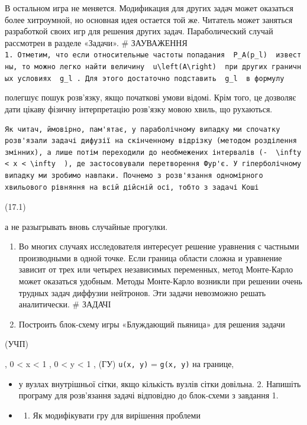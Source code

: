 \documentclass[
  ukrainian,
]{article}
\providecommand{\tightlist}{%
  \setlength{\itemsep}{0pt}\setlength{\parskip}{0pt}}
\begin{document}
В остальном игра не меняется. Модификация для других задач может
оказаться более хитроумной, но основная идея остается той же. Читатель
может заняться разработкой своих игр для решения других задач.
Параболический случай рассмотрен в разделе «Задачи». \# ЗАУВАЖЕННЯ
\texttt{1.\ Отметим,\ что\ если\ относительные\ частоты\ попадания\ \ \textquotesingle{}P\_A(p\_l)\textquotesingle{}\ \ известны,\ то\ можно\ легко\ найти\ величину\ \ \textquotesingle{}u\textbackslash{}left(A\textbackslash{}right)\textquotesingle{}\ \ при\ других\ граничных\ условиях\ \ \textquotesingle{}g\_l\textquotesingle{}\ .\ Для\ этого\ достаточно\ подставить\ \ \textquotesingle{}g\_l\textquotesingle{}\ \ в\ формулу}

полегшує пошук розв'язку, якщо початкові умови відомі. Крім того, це
дозволяє дати цікаву фізичну інтерпретацію розв'язку мовою хвиль, що
рухаються.

\begin{verbatim}
Як читач, ймовірно, пам'ятає, у параболічному випадку ми спочатку розв'язали задачі дифузії на скінченному відрізку (методом розділення змінних), а лише потім переходили до необмежених інтервалів (-  \infty < x < \infty  ), де застосовували перетворення Фур'є. У гіперболічному випадку ми зробимо навпаки. Почнемо з розв'язання одномірного хвильового рівняння на всій дійсній осі, тобто з задачі Коші
\end{verbatim}

(17.1)

а не разыгрывать вновь случайные прогулки.

\begin{enumerate}
\def\labelenumi{\arabic{enumi}.}
\setcounter{enumi}{1}
\tightlist
\item
  Во многих случаях исследователя интересует решение уравнения с
  частными производными в одной точке. Если граница области сложна и
  уравнение зависит от трех или четырех независимых переменных, метод
  Монте-Карло может оказаться удобным. Методы Монте-Карло возникли при
  решении очень трудных задач диффузии нейтронов. Эти задачи невозможно
  решать аналитически. \# ЗАДАЧІ
\item
  Построить блок-схему игры «Блуждающий пьяница» для решения задачи
\end{enumerate}

(УЧП)

, 0 \textless{} x \textless{} 1 , 0 \textless{} y \textless{} 1 , (ГУ)
\texttt{u(x,\ y)} = \texttt{g(x,\ y)} на границе,

\begin{itemize}
\item
  у вузлах внутрішньої сітки, якщо кількість вузлів сітки довільна. 2.
  Напишіть програму для розв'язання задачі відповідно до блок-схеми з
  завдання 1.
\item
  \begin{enumerate}
  \def\labelenumi{\arabic{enumi}.}
  \setcounter{enumi}{2}
  \tightlist
  \item
    Як модифікувати гру для вирішення проблеми
  \end{enumerate}
\end{itemize}
\end{document}
